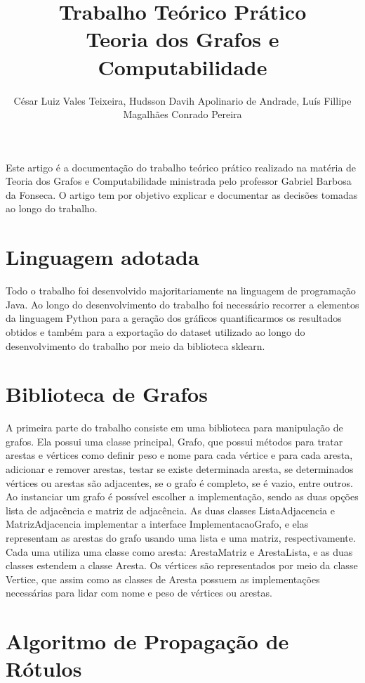 \documentclass[12pt]{article}
\title{Trabalho Teórico Prático\\ Teoria dos Grafos e Computabilidade}
\author{César Luiz Vales Teixeira\inst{1}, Hudsson Davih Apolinario de Andrade\inst{2}, Luís Fillipe Magalhães Conrado Pereira\inst{3} }
\begin{document}
 

\maketitle

     
\begin{resumo} 
  Este artigo é a documentação do trabalho teórico prático realizado na matéria de Teoria dos Grafos e Computabilidade ministrada pelo professor Gabriel Barbosa da Fonseca. O artigo tem por objetivo explicar e documentar as decisões tomadas ao longo do trabalho.
\end{resumo}

\section{Linguagem adotada}
Todo o trabalho foi desenvolvido majoritariamente na linguagem de programação Java. Ao longo do desenvolvimento do trabalho foi necessário recorrer a elementos da linguagem Python para a geração dos gráficos quantificarmos os resultados obtidos e também para a exportação do dataset utilizado ao longo do desenvolvimento do trabalho por meio da biblioteca sklearn.

\section{Biblioteca de Grafos}

A primeira parte do trabalho consiste em uma biblioteca para manipulação de grafos. Ela possui uma classe principal, Grafo, que possui métodos para tratar arestas e vértices como definir peso e nome para cada vértice e para cada aresta, adicionar e remover arestas, testar se existe determinada aresta, se determinados vértices ou arestas são adjacentes, se o grafo é completo, se é vazio, entre outros. Ao instanciar um grafo é possível escolher a implementação, sendo as duas opções lista de adjacência e matriz de adjacência. As duas classes ListaAdjacencia e MatrizAdjacencia implementar a interface ImplementacaoGrafo, e elas representam as arestas do grafo usando uma lista e uma matriz, respectivamente. Cada uma utiliza uma classe como aresta: ArestaMatriz e ArestaLista, e as duas classes estendem a classe Aresta. Os vértices são representados por meio da classe Vertice, que assim como as classes de Aresta possuem as implementações necessárias para lidar com nome e peso de vértices ou arestas.

\section{Algoritmo de Propagação de Rótulos} 
\end{document}
